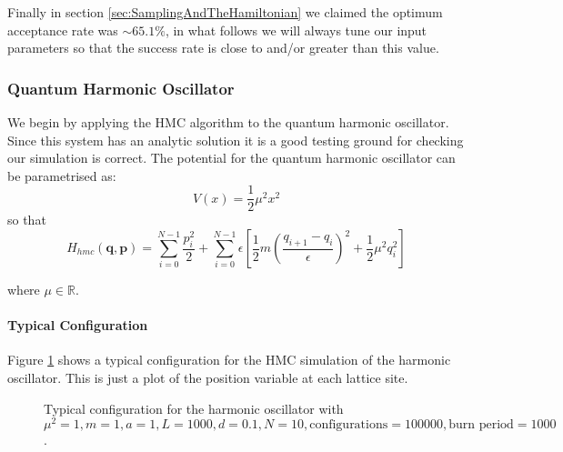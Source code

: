 \documentclass[12pt]{article}
\begin{document}
            Finally in section \ref{sec:SamplingAndTheHamiltonian} we claimed the optimum acceptance rate was $\sim 65.1\%$, in what follows we will always tune our input parameters so that the success rate is close to and/or greater than this value.
            

    
        \subsubsection{Quantum Harmonic Oscillator}
            \label{sec:QuantumHarmonicOscillator}
            We begin by applying the HMC algorithm to the quantum harmonic oscillator. Since this system has an analytic solution it is a good testing ground for checking our simulation is correct. The potential for the quantum harmonic oscillator can be parametrised as:
            \begin{equation}
                \label{eq:HarmonicPotential}
                V\left(x\right) = \frac{1}{2}\mu^2x^2
            \end{equation}
            so that 
            \begin{equation}
                \label{eq:HarmonicPotential}
                H_{hmc}\left(\bm{q},\bm{p}\right) = \sum_{i=0}^{N-1} \frac{p_i^2}{2} + \sum_{i=0}^{N-1} \epsilon \left[\frac{1}{2}m\left(\frac{q_{i+1}-q_{i}}{\epsilon}\right)^2 + \frac{1}{2}\mu^2q_i^2\right]
            \end{equation}

            where $\mu \in \mathbb{R}$.

            \paragraph{Typical Configuration}
                Figure \ref{fig:TypicalHarmonicPath} shows a typical configuration for the HMC simulation of the harmonic oscillator. This is just a plot of the position variable at each lattice site. 
                \begin{figure}
                    \centering
                        \caption{Typical configuration for the harmonic oscillator with $\mu^2 = 1, m = 1, a = 1, L = 1000, d = 0.1, N = 10, \text{configurations} = 100000, \text{burn period} = 1000$.}
                        \label{fig:TypicalHarmonicPath}
                \end{figure}
\end{document}
